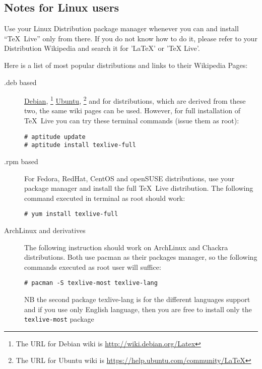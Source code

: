 \documentclass[a4paper]{article}
\begin{document}
\subsection{Notes for Linux users}

Use your Linux Distribution package manager whenever you can and install
``\TeX\ Live'' only from there. If you do not know how to do it, please refer to
your Distribution Wikipedia and search it for 'LaTeX' or 'TeX Live'.

Here is a list of most popular distributions and links to their Wikipedia Pages:

\begin{description}
    \item[.deb based] 
        \href{http://wiki.debian.org/Latex}{Debian},
        \footnote{The URL for Debian wiki is \url{http://wiki.debian.org/Latex}}
        \href{https://help.ubuntu.com/community/LaTeX}{Ubuntu},
        \footnote{The URL for Ubuntu wiki is
        \url{https://help.ubuntu.com/community/LaTeX}}
        and for distributions, which are derived from these two, the same wiki
        pages can be used. However, for full installation of \TeX\ Live you can try
        these terminal commands (issue them as root):
\begin{lstlisting}
# aptitude update
# aptitude install texlive-full
\end{lstlisting}

    \item[.rpm based]
        For Fedora, RedHat, CentOS and openSUSE distributions, use your package
        manager and install the full \TeX\ Live distribution. The following
        command executed in terminal as root should work:
\begin{lstlisting}
# yum install texlive-full
\end{lstlisting}

    \item[ArchLinux and derivatives]
        The following instruction should work on ArchLinux and Chackra
        distributions. Both use pacman as their packages manager, so the
        following commands executed as root user will suffice:
\begin{lstlisting}
# pacman -S texlive-most texlive-lang
\end{lstlisting}
        NB the second package texlive-lang is for the different languages
        support and if you use only English language, then you are free to
        install only the \verb|texlive-most| package


\end{description}
\end{document}
